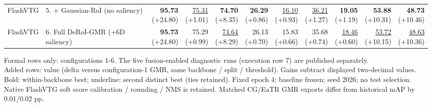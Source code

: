 \documentclass{article}
\begin{document}
{\begin{tabular}{llrrrrrrrrr}
FlashVTG & 5. + Gaussian-RoI (no saliency) & \shortstack{\textbf{95.73} \\ {\scriptsize (+24.80)}} & \shortstack{\underline{75.31} \\ {\scriptsize (+1.01)}} & \shortstack{\textbf{74.70} \\ {\scriptsize (+8.35)}} & \shortstack{\textbf{26.29} \\ {\scriptsize (+0.86)}} & \shortstack{\underline{16.10} \\ {\scriptsize (+0.93)}} & \shortstack{\underline{36.21} \\ {\scriptsize (+1.27)}} & \shortstack{\textbf{19.05} \\ {\scriptsize (+1.19)}} & \shortstack{\textbf{53.88} \\ {\scriptsize (+10.31)}} & \shortstack{\textbf{48.73} \\ {\scriptsize (+10.46)}} \\
FlashVTG & 6. Full DeRoI-GMR (+6D saliency) & \shortstack{\textbf{95.73} \\ {\scriptsize (+24.80)}} & \shortstack{75.29 \\ {\scriptsize (+0.99)}} & \shortstack{\underline{74.64} \\ {\scriptsize (+8.29)}} & \shortstack{26.13 \\ {\scriptsize (+0.70)}} & \shortstack{15.83 \\ {\scriptsize (+0.66)}} & \shortstack{35.68 \\ {\scriptsize (+0.74)}} & \shortstack{\underline{18.46} \\ {\scriptsize (+0.60)}} & \shortstack{\underline{53.72} \\ {\scriptsize (+10.15)}} & \shortstack{\underline{48.63} \\ {\scriptsize (+10.36)}} \\
\bottomrule\end{tabular}}\par\medskip\footnotesize
Formal rows only: configurations 1-6. The five fusion-enabled diagnostic runs (execution row 7) are published separately.\\Added rows: value (delta versus configuration-1 GMR, same backbone / split / threshold). Gains subtract displayed two-decimal values.\\Bold: within-backbone best; underline: second distinct best (ties retained). Fixed epoch 4; baseline frozen; seed 2026; no test selection.\\Native FlashVTG soft score calibration / rounding / NMS is retained. Matched CG/EaTR GMR exports differ from historical mAP by 0.01/0.02 pp.
\end{document}
